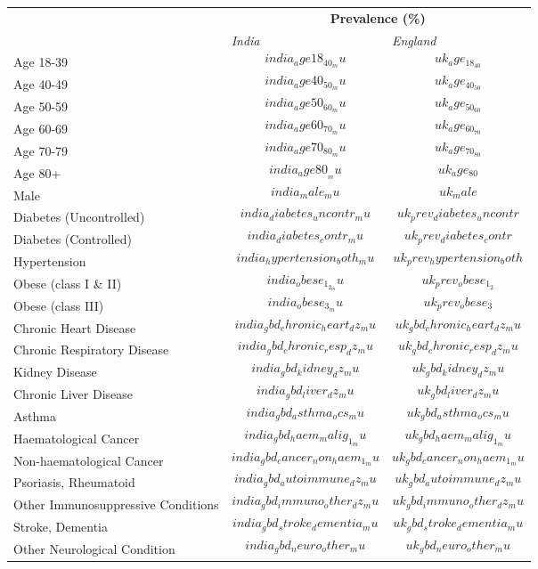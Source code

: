 
\begin{tabular}{p{6cm}p{1.1cm}p{1cm}}
& \multicolumn{2}{c}{\textbf{Prevalence (\%)  }} \\[0.5ex] & \emph{India} & \emph{England} \\[2ex]
Age 18-39 & $$india_age18_40_mu$$ & $$uk_age_18_40$$ \\[0.25ex]
Age 40-49 & $$india_age40_50_mu$$ & $$uk_age_40_50$$ \\[0.25ex]
Age 50-59 & $$india_age50_60_mu$$ & $$uk_age_50_60$$\\[0.25ex]
Age 60-69 & $$india_age60_70_mu$$ & $$uk_age_60_70$$\\[0.25ex]
Age 70-79 & $$india_age70_80_mu$$ & $$uk_age_70_80$$\\[0.25ex]
Age 80+ & $$india_age80__mu$$ & $$uk_age_80$$ \\[0.25ex]
Male & $$india_male_mu$$ & $$uk_male$$ \\[0.25ex]
Diabetes (Uncontrolled) & $$india_diabetes_uncontr_mu$$ & $$uk_prev_diabetes_uncontr$$ \\[0.25ex]
Diabetes (Controlled) & $$india_diabetes_contr_mu$$ & $$uk_prev_diabetes_contr$$ \\[0.25ex]
Hypertension & $$india_hypertension_both_mu$$ & $$uk_prev_hypertension_both$$ \\[0.25ex]
Obese (class I \& II) & $$india_obese_1_2_mu$$ & $$uk_prev_obese_1_2$$ \\[0.25ex]
Obese (class III) & $$india_obese_3_mu$$ & $$uk_prev_obese_3$$ \\[0.25ex]
Chronic Heart Disease & $$india_gbd_chronic_heart_dz_mu$$ & $$uk_gbd_chronic_heart_dz_mu$$ \\[0.25ex]
Chronic Respiratory Disease & $$india_gbd_chronic_resp_dz_mu$$ & $$uk_gbd_chronic_resp_dz_mu$$ \\[0.25ex]
Kidney Disease & $$india_gbd_kidney_dz_mu$$ & $$uk_gbd_kidney_dz_mu$$ \\[0.25ex]
Chronic Liver Disease & $$india_gbd_liver_dz_mu$$ & $$uk_gbd_liver_dz_mu$$ \\[0.25ex]
Asthma & $$india_gbd_asthma_ocs_mu$$ & $$uk_gbd_asthma_ocs_mu$$ \\[0.25ex]
Haematological Cancer & $$india_gbd_haem_malig_1_mu$$ & $$uk_gbd_haem_malig_1_mu$$\\[0.25ex]
Non-haematological Cancer & $$india_gbd_cancer_non_haem_1_mu$$ & $$uk_gbd_cancer_non_haem_1_mu$$ \\[0.25ex]
Psoriasis, Rheumatoid & $$india_gbd_autoimmune_dz_mu$$ & $$uk_gbd_autoimmune_dz_mu$$ \\[0.25ex]
Other Immunosuppressive Conditions & $$india_gbd_immuno_other_dz_mu$$ & $$uk_gbd_immuno_other_dz_mu$$ \\[0.25ex]
Stroke, Dementia & $$india_gbd_stroke_dementia_mu$$ & $$uk_gbd_stroke_dementia_mu$$ \\[0.25ex]
Other Neurological Condition & $$india_gbd_neuro_other_mu$$ & $$uk_gbd_neuro_other_mu$$ \\[0.25ex]
\end{tabular}
